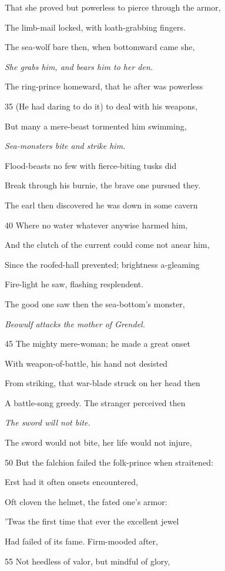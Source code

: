 That she proved but powerless to pierce through the armor,

The limb-mail locked, with loath-grabbing fingers.

The sea-wolf bare then, when bottomward came she,

\emph{She grabs him,
and bears him to
her den.}

The ring-prince homeward, that he after was powerless

35
(He had daring to do it) to deal with his weapons,

But many a mere-beast tormented him swimming,

\emph{Sea-monsters bite
and strike him.}

Flood-beasts no few with fierce-biting tusks did

Break through his burnie, the brave one pursued they.

The earl then discovered he was down in some cavern

40
Where no water whatever anywise harmed him,

And the clutch of the current could come not anear him,

Since the roofed-hall prevented; brightness a-gleaming

Fire-light he saw, flashing resplendent.

The good one saw then the sea-bottom’s monster,

\emph{Beowulf attacks
the mother of
Grendel.}

45
The mighty mere-woman; he made a great onset

With weapon-of-battle, his hand not desisted

From striking, that war-blade struck on her head then

A battle-song greedy. The stranger perceived then

\emph{The sword will not
bite.}

The sword would not bite, her life would not injure,

50
But the falchion failed the folk-prince when straitened:

Erst had it often onsets encountered,

Oft cloven the helmet, the fated one’s armor:

’Twas the first time that ever the excellent jewel

Had failed of its fame. Firm-mooded after,

55
Not heedless of valor, but mindful of glory,

